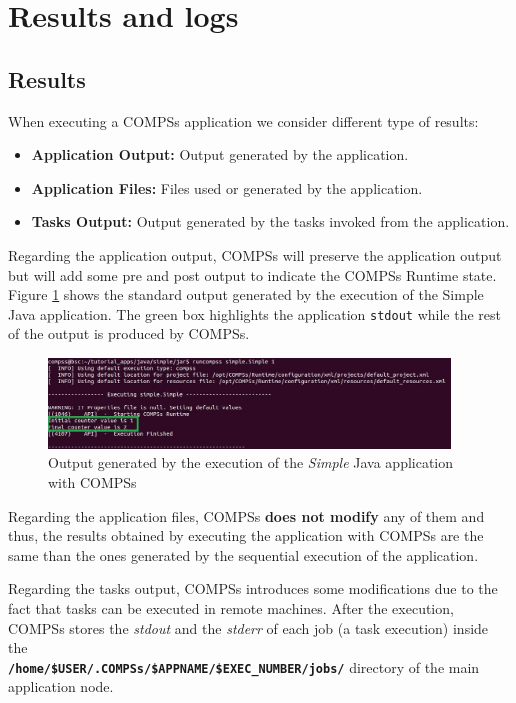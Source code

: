  \section{Results and logs}
\label{sec:Results_and_Logs}

\subsection{Results}
When executing a COMPSs application we consider different type of results:
\begin{itemize}
 \item \textbf{Application Output:} Output generated by the application.
 \item \textbf{Application Files:}  Files used or generated by the application.
 \item \textbf{Tasks Output:} Output generated by the tasks invoked from the application.
\end{itemize}

Regarding the application output, COMPSs will preserve the application output but will add some pre and post output to indicate
the COMPSs Runtime state. Figure \ref{fig:compss_out} shows the standard output generated by the execution of the 
Simple Java application. The green box highlights the application \texttt{stdout} while the rest of the output is produced by COMPSs.  
\begin{figure}[!ht]
  \centering
    \includegraphics[width=0.95\textwidth]{./Sections/3_Results_and_Logs/Figures/simple_java_stdout.jpeg}
    \caption{Output generated by the execution of the \textit{Simple} Java application with COMPSs}
    \label{fig:compss_out}
\end{figure}

Regarding the application files, COMPSs \textbf{does not modify} any of them and thus, the
results obtained by executing the application with COMPSs are the same than the ones generated by the sequential execution
of the application.

Regarding the tasks output, COMPSs introduces some modifications due to the fact that tasks can be executed in remote
machines. After the execution, COMPSs stores the \textit{stdout} and the \textit{stderr} of each job (a task execution) inside the\\ \textbf{\texttt{/home/\$USER/.COMPSs/\$APPNAME/\$EXEC\_NUMBER/jobs/}} directory of the main application node.

